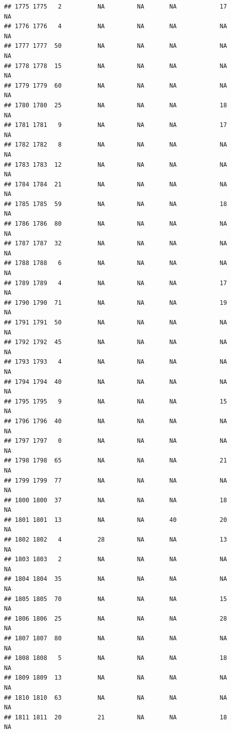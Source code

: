 \documentclass[man]{apa6}
\begin{document}
\begin{verbatim}
## 1775 1775   2          NA         NA       NA            17       NA
## 1776 1776   4          NA         NA       NA            NA       NA
## 1777 1777  50          NA         NA       NA            NA       NA
## 1778 1778  15          NA         NA       NA            NA       NA
## 1779 1779  60          NA         NA       NA            NA       NA
## 1780 1780  25          NA         NA       NA            18       NA
## 1781 1781   9          NA         NA       NA            17       NA
## 1782 1782   8          NA         NA       NA            NA       NA
## 1783 1783  12          NA         NA       NA            NA       NA
## 1784 1784  21          NA         NA       NA            NA       NA
## 1785 1785  59          NA         NA       NA            18       NA
## 1786 1786  80          NA         NA       NA            NA       NA
## 1787 1787  32          NA         NA       NA            NA       NA
## 1788 1788   6          NA         NA       NA            NA       NA
## 1789 1789   4          NA         NA       NA            17       NA
## 1790 1790  71          NA         NA       NA            19       NA
## 1791 1791  50          NA         NA       NA            NA       NA
## 1792 1792  45          NA         NA       NA            NA       NA
## 1793 1793   4          NA         NA       NA            NA       NA
## 1794 1794  40          NA         NA       NA            NA       NA
## 1795 1795   9          NA         NA       NA            15       NA
## 1796 1796  40          NA         NA       NA            NA       NA
## 1797 1797   0          NA         NA       NA            NA       NA
## 1798 1798  65          NA         NA       NA            21       NA
## 1799 1799  77          NA         NA       NA            NA       NA
## 1800 1800  37          NA         NA       NA            18       NA
## 1801 1801  13          NA         NA       40            20       NA
## 1802 1802   4          28         NA       NA            13       NA
## 1803 1803   2          NA         NA       NA            NA       NA
## 1804 1804  35          NA         NA       NA            NA       NA
## 1805 1805  70          NA         NA       NA            15       NA
## 1806 1806  25          NA         NA       NA            28       NA
## 1807 1807  80          NA         NA       NA            NA       NA
## 1808 1808   5          NA         NA       NA            18       NA
## 1809 1809  13          NA         NA       NA            NA       NA
## 1810 1810  63          NA         NA       NA            NA       NA
## 1811 1811  20          21         NA       NA            18       NA

\end{verbatim}
\end{document}
